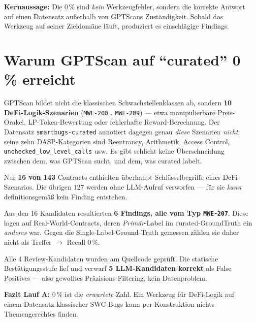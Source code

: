 \documentclass[11pt,a4paper]{scrartcl}
\newcommand{\code}[1]{\texttt{#1}}
\begin{document}
\noindent\textbf{Kernaussage:} Die 0\,\% sind \emph{kein} Werkzeugfehler, sondern die
korrekte Antwort auf einen Datensatz außerhalb von GPTScans Zuständigkeit. Sobald
das Werkzeug auf seiner Zieldomäne läuft, produziert es einschlägige Findings.

\section{Warum GPTScan auf \enquote{curated} 0\,\% erreicht}
\label{sec:null}

GPTScan bildet nicht die klassischen Schwachstellenklassen ab, sondern
\textbf{10 DeFi-Logik-Szenarien} (\code{MWE-200}\,\dots\,\code{MWE-209}) —
etwa manipulierbare Preis-Orakel, LP-Token-Bewertung oder fehlerhafte
Reward-Berechnung. Der Datensatz \code{smartbugs-curated} annotiert dagegen genau
\emph{diese} Szenarien \emph{nicht}: seine zehn DASP-Kategorien sind Reentrancy,
Arithmetik, Access Control, \code{unchecked\_low\_level\_calls} usw. Es gibt schlicht
keine Überschneidung zwischen dem, was GPTScan sucht, und dem, was curated labelt.

\begin{description}[leftmargin=1.4em,style=nextline]
  \item[Stufe 1 — Keyword-/Szenario-Vorfilter:] Nur \textbf{16 von 143}
    Contracts enthielten überhaupt Schlüsselbegriffe eines DeFi-Szenarios. Die
    übrigen 127 werden ohne LLM-Aufruf verworfen — für sie \emph{kann} definitionsgemäß
    kein Finding entstehen.
  \item[Stufe 2 — LLM + statische Bestätigung:] Aus den 16 Kandidaten
    resultierten \textbf{6 Findings, alle vom Typ \code{MWE-207}}. Diese lagen auf
    Real-World-Contracts, deren \emph{Primär}-Label im curated-GroundTruth ein
    \emph{anderes} war. Gegen die Single-Label-Ground-Truth gemessen zählen sie
    daher nicht als Treffer $\rightarrow$ Recall 0\,\%.
  \item[Static-Stufe arbeitete bestimmungsgemäß:] Alle 4 Review-Kandidaten
    wurden am Quellcode geprüft. Die statische Bestätigungsstufe lief und verwarf
    \textbf{5 LLM-Kandidaten korrekt} als False Positives — also gewolltes
    Präzisions-Filtering, kein Datenproblem.
\end{description}

\noindent
\textbf{Fazit Lauf A:} 0\,\% ist die \emph{erwartete} Zahl. Ein Werkzeug für
DeFi-Logik auf einem Datensatz klassischer SWC-Bugs kann per Konstruktion nichts
Themengerechtes finden.
\end{document}
